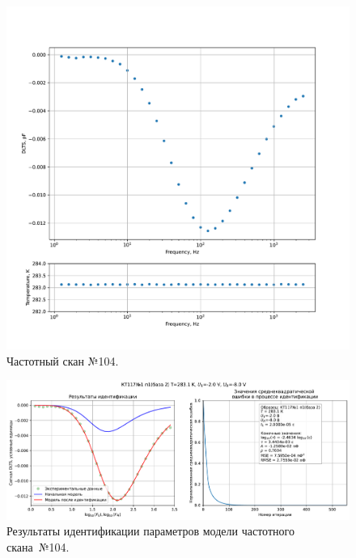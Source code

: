 \begin{figure}[!ht]
    \centering
    \includegraphics[width=1\textwidth]{../plots/КТ117№1_п1(база 2)_2500Гц-1Гц_1пФ_+10С_-2В-8В_200мВ_20мкс_шаг_0,1.pdf}
    \caption{Частотный скан №104.}
    \label{pic:frequency_scan_104}
\end{figure}

\begin{figure}[!ht]
    \centering
    \includegraphics[width=1\textwidth]{../plots/КТ117№1_п1(база 2)_2500Гц-1Гц_1пФ_+10С_-2В-8В_200мВ_20мкс_шаг_0,1_model.pdf}
    \caption{Результаты идентификации параметров модели частотного скана~№104.}
    \label{pic:frequency_scan_model104}
\end{figure}

\pagebreak


